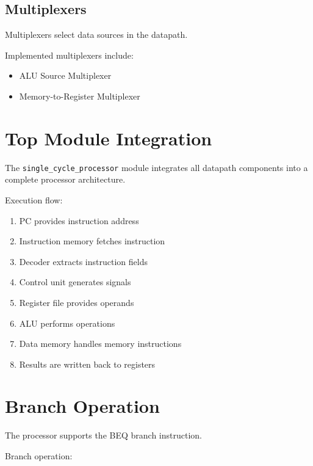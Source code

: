 \documentclass[conference]{IEEEtran}
\begin{document}

\subsection{Multiplexers}

Multiplexers select data sources in the datapath.

Implemented multiplexers include:

\begin{itemize}
    \item ALU Source Multiplexer
    \item Memory-to-Register Multiplexer
\end{itemize}


\section{Top Module Integration}

The \texttt{single\_cycle\_processor} module integrates all datapath components into a complete processor architecture.

Execution flow:

\begin{enumerate}
    \item PC provides instruction address
    \item Instruction memory fetches instruction
    \item Decoder extracts instruction fields
    \item Control unit generates signals
    \item Register file provides operands
    \item ALU performs operations
    \item Data memory handles memory instructions
    \item Results are written back to registers
\end{enumerate}


\section{Branch Operation}

The processor supports the BEQ branch instruction.

Branch operation:
\end{document}
